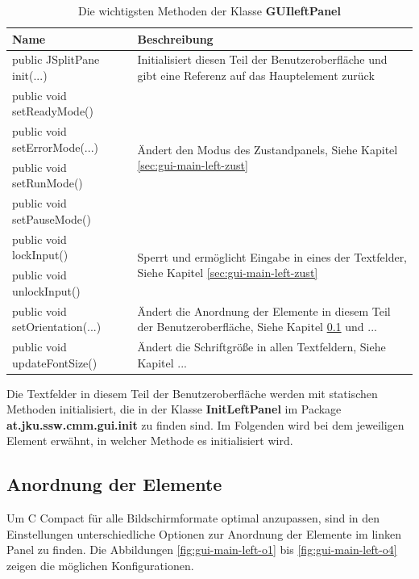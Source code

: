\def\arraystretch{1.6}
\begin{table}
\begin{tabularx}{\columnwidth}{l|p{9cm}}
\textbf{Name}&\textbf{Beschreibung}\\
\hline
\hline
public JSplitPane init(...)&Initialisiert diesen Teil der Benutzeroberfläche und gibt eine Referenz auf das Hauptelement zurück\\
\hline
public void setReadyMode()&\multirow{4}{*}{\parbox{9cm}{Ändert den Modus des Zustandpanels, Siehe Kapitel \ref{sec:gui-main-left-zust}}}\\
public void setErrorMode(...)&\\
public void setRunMode()&\\
public void setPauseMode()&\\
\hline
public void lockInput()&\multirow{2}{*}{\parbox{9cm}{Sperrt und ermöglicht Eingabe in eines der Textfelder, Siehe Kapitel \ref{sec:gui-main-left-zust}}}\\
public void unlockInput()&\\
\hline
public void setOrientation(...)&Ändert die Anordnung der Elemente in diesem Teil der Benutzeroberfläche, Siehe Kapitel \ref{sec:gui-main-left-ord} und ...\\
\hline
public void updateFontSize()&Ändert die Schriftgröße in allen Textfeldern, Siehe Kapitel ...
\end{tabularx}
\caption{Die wichtigsten Methoden der Klasse \textbf{GUIleftPanel}}\label{tab:gui-main-left-methods}
\end{table}

Die Textfelder in diesem Teil der Benutzeroberfläche werden mit statischen Methoden initialisiert, die in der Klasse \textbf{InitLeftPanel} im Package \textbf{at.jku.ssw.cmm.gui.init} zu finden sind. Im Folgenden wird bei dem jeweiligen Element erwähnt, in welcher Methode es initialisiert wird.

\subsection{Anordnung der Elemente}
\label{sec:gui-main-left-ord}

Um C Compact für alle Bildschirmformate optimal anzupassen, sind in den Einstellungen unterschiedliche Optionen zur Anordnung der Elemente im linken Panel zu finden. Die Abbildungen \ref{fig:gui-main-left-o1} bis \ref{fig:gui-main-left-o4} zeigen die möglichen Konfigurationen.

